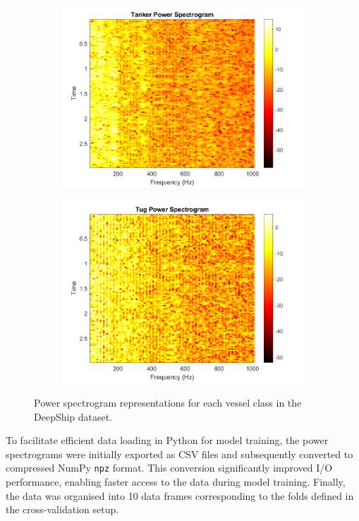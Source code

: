 \begin{figure}[p]
    \begin{subfigure}{0.49\textwidth}
        \centering
        \includegraphics[width=\linewidth]{img/ch3/power_spectrogram/Tanker.png} 
    \end{subfigure}
    \hfill
    \begin{subfigure}{0.49\textwidth}
        \centering
        \includegraphics[width=\linewidth]{img/ch3/power_spectrogram/Tug.png} 
    \end{subfigure}
    \caption{Power spectrogram representations for each vessel class in the DeepShip dataset.}
    \label{fig:powerspectrogram-example}
\end{figure}


To facilitate efficient data loading in Python for model training, the power spectrograms were initially exported as CSV files and subsequently converted to compressed NumPy \texttt{npz} format. This conversion significantly improved I/O performance, enabling faster access to the data during model training. Finally, the data was organised into 10 data frames corresponding to the folds defined in the cross-validation setup.

